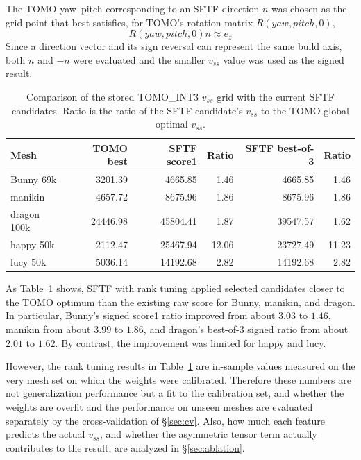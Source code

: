\documentclass[11pt,a4paper]{article}
\begin{document}
The TOMO yaw--pitch corresponding to an SFTF direction $n$ was chosen as the grid point that best satisfies,
for TOMO's rotation matrix $R(yaw,pitch,0)$,
\begin{equation}
R(yaw,pitch,0)n \approx e_z
\end{equation}
Since a direction vector and its sign reversal can represent the same build axis,
both $n$ and $-n$ were evaluated and the smaller $v_{ss}$ value was used as the signed result.

\begin{table}[H]
\centering
\caption{Comparison of the stored TOMO\_INT3 $v_{ss}$ grid with the current SFTF candidates.
Ratio is the ratio of the SFTF candidate's $v_{ss}$ to the TOMO global optimal $v_{ss}$.}
\label{tab:sftf-tomo-comparison}
\begin{tabular}{lrrrrr}
\toprule
Mesh & TOMO best & SFTF score1 & Ratio & SFTF best-of-3 & Ratio\\
\midrule
Bunny 69k & 3201.39 & 4665.85 & 1.46 & 4665.85 & 1.46\\
manikin & 4657.72 & 8675.96 & 1.86 & 8675.96 & 1.86\\
dragon 100k & 24446.98 & 45804.41 & 1.87 & 39547.57 & 1.62\\
happy 50k & 2112.47 & 25467.94 & 12.06 & 23727.49 & 11.23\\
lucy 50k & 5036.14 & 14192.68 & 2.82 & 14192.68 & 2.82\\
\bottomrule
\end{tabular}
\end{table}

As Table~\ref{tab:sftf-tomo-comparison} shows,
SFTF with rank tuning applied selected candidates closer to the TOMO optimum than the existing raw score for Bunny, manikin, and dragon.
In particular, Bunny's signed score1 ratio improved from about $3.03$ to $1.46$,
manikin from about $3.99$ to $1.86$,
and dragon's best-of-3 signed ratio from about $2.01$ to $1.62$.
By contrast, the improvement was limited for happy and lucy.

However, the rank tuning results in Table~\ref{tab:sftf-tomo-comparison} are in-sample values measured on the very mesh set on which the weights were calibrated.
Therefore these numbers are not generalization performance but a fit to the calibration set,
and whether the weights are overfit and the performance on unseen meshes are evaluated separately by the cross-validation of \S\ref{sec:cv}.
Also, how much each feature predicts the actual $v_{ss}$, and whether the asymmetric tensor term actually contributes to the result, are analyzed in \S\ref{sec:ablation}.
\end{document}
